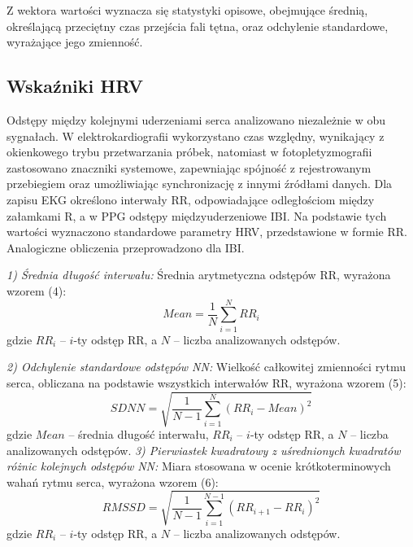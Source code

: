 \documentclass[journal]{IEEEtran}
\begin{document}
{Z wektora wartości wyznacza się statystyki opisowe, obejmujące średnią, określającą przeciętny czas przejścia fali tętna, oraz odchylenie standardowe, wyrażające jego zmienność.

\subsection{Wskaźniki HRV}
Odstępy między kolejnymi uderzeniami serca analizowano niezależnie w obu sygnałach. W elektrokardiografii wykorzystano czas względny, wynikający z okienkowego trybu przetwarzania próbek, natomiast w fotopletyzmografii zastosowano znaczniki systemowe, zapewniając spójność z rejestrowanym przebiegiem oraz umożliwiając synchronizację z innymi źródłami danych. Dla zapisu EKG określono interwały RR, odpowiadające odległościom między załamkami R, a w PPG odstępy międzyuderzeniowe IBI. Na podstawie tych wartości wyznaczono standardowe parametry HRV, przedstawione w formie RR. Analogiczne obliczenia przeprowadzono dla IBI.

\noindent\textit{1) Średnia długość interwału:} 
Średnia arytmetyczna odstępów RR, wyrażona wzorem (4):
\begin{equation}
    Mean = \frac{1}{N} \sum_{i=1}^{N} RR_i
\end{equation}
gdzie $RR_i$ -- $i$-ty odstęp RR, a $N$ – liczba analizowanych odstępów.

\noindent\textit{2) Odchylenie standardowe odstępów NN:} 
Wielkość całkowitej zmienności rytmu serca, obliczana na podstawie wszystkich interwałów RR, wyrażona wzorem (5):
\begin{equation}
    SDNN = \sqrt{\frac{1}{N-1} \sum_{i=1}^{N} (RR_i - Mean)^2}
\end{equation}
gdzie $Mean$ – średnia długość interwału, $RR_i$ – $i$-ty odstęp RR, a $N$ – liczba analizowanych odstępów. 
\newpage
\noindent\textit{3) Pierwiastek kwadratowy z uśrednionych kwadratów różnic kolejnych odstępów NN:} 
Miara stosowana w ocenie krótkoterminowych wahań rytmu serca, wyrażona wzorem (6):
\begin{equation}
    RMSSD = \sqrt{\frac{1}{N-1} \sum_{i=1}^{N-1} (RR_{i+1} - RR_i)^2}
\end{equation}
gdzie $RR_i$ -- $i$-ty odstęp RR, a $N$ – liczba analizowanych odstępów.

}
\end{document}
